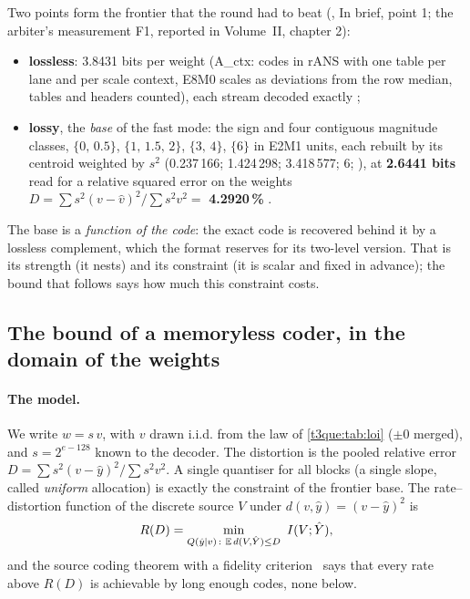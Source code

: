 Two points form the frontier that the round had to beat (, In brief, point 1; the arbiter's measurement F1, reported in Volume~II, chapter 2):
\begin{itemize}
\item \textbf{lossless}: 3.8431 bits per weight (A\_ctx: codes in rANS with one table per lane and per scale context, E8M0 scales as deviations from the row median, tables and headers counted), each stream decoded exactly \mes;
\item \textbf{lossy}, the \emph{base} of the fast mode: the sign and four contiguous magnitude classes, $\{0,\,0.5\}$, $\{1,\,1.5,\,2\}$, $\{3,\,4\}$, $\{6\}$ in E2M1 units, each rebuilt by its centroid weighted by $s^2$ (0.237\,166; 1.424\,298; 3.418\,577; 6; ), at \textbf{2.6441 bits} read for a relative squared error on the weights $D = \sum s^2 (v - \hat v)^2 / \sum s^2 v^2 = $ \textbf{4.2920\,\%} \mes.
\end{itemize}
The base is a \emph{function of the code}: the exact code is recovered behind it by a lossless complement, which the format reserves for its two-level version. That is its strength (it nests) and its constraint (it is scalar and fixed in advance); the bound that follows says how much this constraint costs.

\subsection{The bound of a memoryless coder, in the domain of the weights}

\paragraph{The model.} We write $w = s\,v$, with $v$ drawn i.i.d. from the law of \cref{t3que:tab:loi} ($\pm0$ merged), and $s = 2^{e-128}$ known to the decoder. The distortion is the pooled relative error $D = \sum s^2 (v-\hat y)^2 / \sum s^2 v^2$. A single quantiser for all blocks (a single slope, called \emph{uniform} allocation) is exactly the constraint of the frontier base. The rate--distortion function of the discrete source $V$ under $d(v, \hat y) = (v - \hat y)^2$ is
\begin{equation}\label{t3que:eq:rd}
R(D) = \min_{Q(\hat y \mid v)\,:\ \mathbb{E}\, d(V, \hat Y) \le D}\ I(V ; \hat Y),
\end{equation}
and the source coding theorem with a fidelity criterion~\cite{shannon1959} says that every rate above $R(D)$ is achievable by long enough codes, none below.

